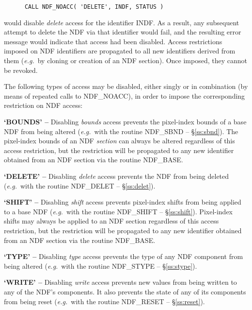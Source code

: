 \documentclass[twoside,11pt]{article}
\newcommand{\htmlref}[2]{#1}
\newcommand{\st}[1]{{\em{#1}}}
\begin{document}
\small
\begin{verbatim}
      CALL NDF_NOACC( 'DELETE', INDF, STATUS )
\end{verbatim}
\normalsize

would disable \st{delete\/} access for the identifier INDF.
As a result, any subsequent attempt to delete the NDF via that identifier
would fail, and the resulting error message would indicate that access had
been disabled. 
Access restrictions imposed on NDF identifiers are propagated to all new
identifiers derived from them (\st{e.g.}\ by cloning or creation of an NDF
section).
Once imposed, they cannot be revoked. 

The following types of access may be disabled, either singly or in
combination (by means of repeated calls to NDF\_NOACC), in order to impose
the corresponding restriction on NDF access: 

\begin{description}

\item{\bf `BOUNDS' --} Disabling \st{bounds\/} access prevents the
pixel-index bounds of a base NDF from being altered (\st{e.g.}\ with the
routine \htmlref{NDF\_SBND}{NDF_SBND} -- \S\ref{ss:sbnd}). 
The pixel-index bounds of an NDF \st{section\/} can always be altered
regardless of this access restriction, but the restriction will be
propagated to any new identifier obtained from an NDF section via the
routine \htmlref{NDF\_BASE}{NDF_BASE}. 

\item{\bf `DELETE' --} Disabling \st{delete\/} access prevents the NDF from
being deleted (\st{e.g.}\ with the routine \htmlref{NDF\_DELET}{NDF_DELET} -- \S\ref{ss:delet}).

\item{\bf `SHIFT' --} Disabling \st{shift\/} access prevents pixel-index
shifts from being applied to a base NDF (\st{e.g.}\ with the routine
\htmlref{NDF\_SHIFT}{NDF_SHIFT} -- \S\ref{ss:shift}). 
Pixel-index shifts may always be applied to an NDF section regardless of
this access restriction, but the restriction will be propagated to any new
identifier obtained from an NDF section via the routine NDF\_BASE. 

\item{\bf `TYPE' --} Disabling \st{type\/} access prevents the type of any
NDF component from being altered (\st{e.g.}\ with the routine \htmlref{NDF\_STYPE}{NDF_STYPE} --
\S\ref{ss:stype}). 

\item{\bf `WRITE' --} Disabling \st{write\/} access prevents new values from 
being written to any of the NDF's components.
It also prevents the state of any of its components from being reset
(\st{e.g.}\ with the routine \htmlref{NDF\_RESET}{NDF_RESET} --
\S\ref{ss:reset}).  

\end{description}
\end{document}
